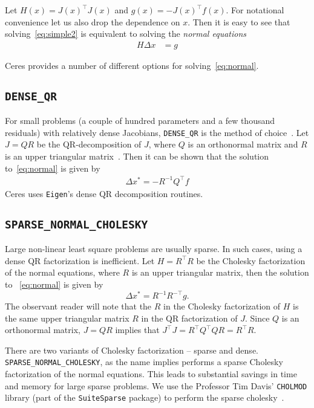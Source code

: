 Let $H(x)= J(x)^\top J(x)$ and $g(x) = -J(x)^\top  f(x)$. For notational convenience let us also drop the dependence on $x$. Then it is easy to see that solving~\eqref{eq:simple2} is equivalent to solving the {\em normal equations}
\begin{align}
H \Delta x  &= g \label{eq:normal}
\end{align}

Ceres provides a number of different options for solving~\eqref{eq:normal}.

\subsection{\texttt{DENSE\_QR}}
For small problems (a couple of hundred parameters and a few thousand residuals) with relatively dense Jacobians, \texttt{DENSE\_QR} is the method of choice~\cite{bjorck1996numerical}. Let $J = QR$ be the QR-decomposition of $J$, where $Q$ is an orthonormal matrix and $R$ is an upper triangular matrix~\cite{trefethen1997numerical}. Then it can be shown that the solution to~\eqref{eq:normal} is given by
\begin{align}
    \Delta x^* = -R^{-1}Q^\top f
\end{align}
Ceres uses \texttt{Eigen}'s dense QR decomposition routines.


\subsection{\texttt{SPARSE\_NORMAL\_CHOLESKY}}
Large non-linear least square problems are usually sparse. In such cases, using a dense QR factorization is inefficient. Let $H = R^\top R$ be the Cholesky factorization of the normal equations, where $R$ is an upper triangular matrix, then the  solution to ~\eqref{eq:normal} is given by
\begin{equation}
    \Delta x^* = R^{-1} R^{-\top} g.
\end{equation}
The observant reader will note that the $R$ in the Cholesky factorization of $H$ is the same upper triangular matrix $R$ in the QR factorization of $J$. Since $Q$ is an orthonormal matrix, $J=QR$ implies that $J^\top J = R^\top Q^\top Q R = R^\top R$.


There are two variants of Cholesky factorization -- sparse and dense. \texttt{SPARSE\_NORMAL\_CHOLESKY}, as the name implies performs a sparse Cholesky factorization of the normal equations. This leads to substantial savings in time and memory for large sparse problems. We use the Professor Tim Davis' \texttt{CHOLMOD} library (part of the \texttt{SuiteSparse} package) to perform the sparse cholesky~\cite{chen2006acs}.



